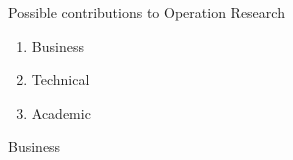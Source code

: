 \documentclass{beamer}
\begin{document}
\begin{frame}[t]{}
    \begin{block}{Possible contributions to Operation Research}
        \begin{enumerate}
            \item Business
            \item Technical
            \item Academic
        \end{enumerate}
    \end{block}
\end{frame}

\begin{frame}{}
    \begin{block}{Business}
    \end{block}
\end{frame}
\end{document}

